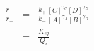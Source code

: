 \begin{eqnarray}
\frac{r_+}{r_-} & = &\frac{k_+}{k_-}\frac{[C]^{\gamma_C}[D]^{\gamma_D}}{[A]^{\gamma_A}[B]^{\gamma_D}} \\
 & = & \frac{K_{eq}}{Q_r}
\end{eqnarray}